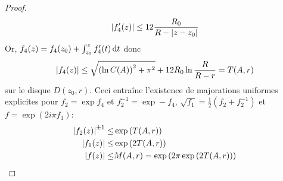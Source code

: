 \documentclass{cours}
\begin{document}
\begin{proof}
	\begin{equation*}
		\left|f_{4}'(z)\right|\leq 12\frac{R_{0}}{R - \left|z - z_{0}\right|}
	\end{equation*}
	Or, $f_{4}(z) = f_{4}(z_{0}) + \int_{z_{0}}^{z}f_{4}'(t){\rm \, d} t$ donc
	\begin{equation*}
		\left|f_{4}(z)\right| \leq \sqrt{\left(\ln C(A)\right)^{2} + \pi^{2}} + 12R_{0}\ln\frac{R}{R - r} = T(A, r)
	\end{equation*}
	sur le disque $D(z_{0}, r)$.
	Ceci entraîne l'existence de majorations uniformes explicites pour $f_{2} = \exp f_{4}$ et $f_{2}^{-1} = \exp -f_{4}$, $\sqrt{f_{1}} = \frac{1}{2}\left(f_{2} + f_{2}^{-1}\right)$ et $f = \exp\left(2i\pi f_{1}\right)$:
	\begin{equation*}
		\begin{aligned}
			\left|f_{2}(z)\right|^{\pm 1} \leq & \exp\left(T(A, r)\right)\\
			\left|f_{1}(z)\right| \leq & \exp\left(2T(A, r)\right)\\
			\left|f(z)\right| \leq& M(A, r) = \exp\left(2\pi \exp\left(2T(A, r)\right)\right)
		\end{aligned}
	\end{equation*}
\end{proof}
\end{document}
